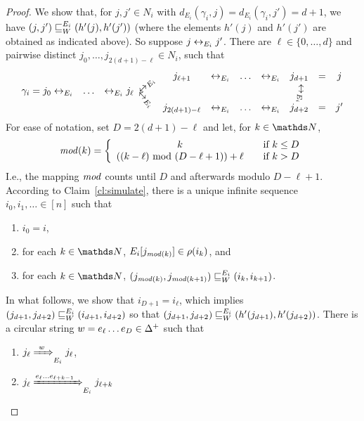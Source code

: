 \documentclass{LMCS}
\begin{document}
\begin{proof}
   We show that, for $j,j' \in N_i$ with $d_{E_i}(\gamma_i,j)
   =d_{E_i}(\gamma_i,j') = d+1$, we have
   $\wsimulate{E_i}{W}{(j,j')}{(h'(j),h'(j'))}$ (where the elements $h'(j)$
   and $h'(j')$ are obtained as indicated above). So suppose $j \edge{E_i}
   j'$. There are $\ell \in \{0,\ldots,d\}$ and pairwise distinct
   $j_0,\ldots,j_{2(d+1)-\ell} \in N_i$, such that\[\begin{array}{ccccccccccc} & & & & \!\!j_{\ell + 1} & \edge{E_i} & \ldots &
    \edge{E_i} & j_{d+1} & = & j\vspace{-1.2ex}\\ \gamma_i = j_0 \edge{E_i}
    & \ldots
    & \edge{E_i} j_\ell \!\!\!\!\! &
    \rotatebox{-45}{$\edge{E_i}$}\hspace{-1.5em}\rotatebox{45}{$\edge{E_i}$} &
    & & & & \rotatebox{-90}{\!\!\!\!\!\!\mbox{$\edge{E_i}$}} & &
    \vspace{-1.7ex}\\ & & & & \!\!j_{2(d+1)-\ell} & \edge{E_i} & \ldots & \edge{E_i}
    & j_{d+2} & = & j'
\end{array}\]
For ease of notation, set $D=2(d+1) - \ell$ and let, for $k \in \N$,
\[
\modit(k) = \left\{
    \begin{array}{cl}
      k & ~~ \text{~if~} k \le D\\
      ((k - \ell) \mod (D - \ell + 1)) + \ell & ~~ \text{~if~} k > D
    \end{array}
\right.
\]
I.e., the mapping $\modit$ counts until $D$ and afterwards modulo $D - \ell +
1$. According to Claim~\ref{cl:simulate}, there is a unique infinite sequence
$i_0,i_1,\ldots \in [n]$ such that
  \begin{enumerate}[$\bullet$]\itemsep=0.5ex
\item $i_0 = i$,
\item for each $k \in \N$, $E_i[j_{\modit(k)}] \in \rho(i_k)$, and
\item for each $k \in \N$,
  $\wsimulate{E_i}{W}{(j_{\modit(k)},j_{\modit(k+1)})}{(i_k,i_{k+1})}$.
\end{enumerate}
In what follows, we show that $i_{D+1}=i_\ell$, which implies
$\wsimulate{E_i}{W}{(j_{d+1},j_{d+2})}{(i_{d+1},i_{d+2})}$ so that
$\wsimulate{E_i}{W}{(j_{d+1},j_{d+2})}{(\hinv(j_{d+1}),\hinv(j_{d+2}))}$.
There is a circular string $w=e_\ell \ldots e_D \in \Dir^+$ such that
\begin{enumerate}[$\bullet$]
\item $\Wleadstoeq{E_i}{w}{j_\ell}{j_\ell}$,
\item $\longWleadstoeq{E_i}{e_\ell \ldots e_{\ell+k-1}}{j_\ell}{j_{\ell+k}}$

\end{enumerate}
\end{proof}
\end{document}

